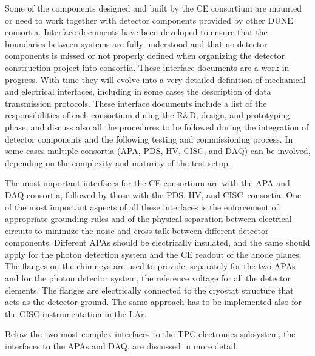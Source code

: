 Some of the components designed and built by the CE consortium are
mounted or need to work together with detector components provided by other DUNE
consortia. Interface documents have been developed to ensure that the boundaries
between systems are fully understood and that no detector components is missed or
not properly defined when organizing the detector construction project into
consortia. These interface documents are a work in progress. With time they will
evolve into a very detailed definition of mechanical and electrical interfaces,
including in some cases the description of data transmission protocols. These
interface documents include a list of the responsibilities of each consortium during the
R\&D, design, and prototyping phase, and discuss also all the procedures to be
followed during the integration of detector components and the following testing
and commissioning process. In some cases multiple consortia (APA, PDS, HV, CISC,
and DAQ) can be involved, depending on the complexity and maturity of the test
setup.

The most important interfaces for the CE consortium are with the APA and DAQ
consortia, followed by those with the PDS, HV, and CISC~consortia. One of the most
important aspects of all these interfaces is the enforcement of appropriate grounding rules
and of the physical separation between electrical circuits to minimize the noise and
cross-talk between different detector components. Different APAs should be electrically
insulated, and the same should apply for the photon detection system and the
CE readout of the anode planes. The flanges on the chimneys are used to provide,
separately for the two APAs and for the photon detector system, the reference
voltage for all the detector elements. The flanges are electrically connected
to the cryostat structure that acts as the detector ground. The same approach
has to be implemented also for the CISC instrumentation in the LAr.

Below the two most complex interfaces to the TPC electronics subsystem, the
interfaces to the APAs and DAQ, are discussed in more detail.

